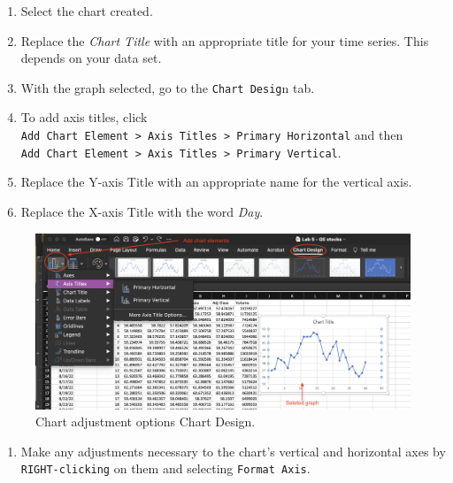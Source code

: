 \documentclass[
]{book}
\providecommand{\tightlist}{%
  \setlength{\itemsep}{0pt}\setlength{\parskip}{0pt}}
\begin{document}
\begin{enumerate}
\def\labelenumi{\arabic{enumi}.}
\setcounter{enumi}{2}
\tightlist
\item
  Select the chart created.
\item
  Replace the \emph{Chart Title} with an appropriate title for your time series. This depends on your data set.
\item
  With the graph selected, go to the \texttt{Chart\ Desig}n tab.
\item
  To add axis titles, click \texttt{Add\ Chart\ Element\ \textgreater{}\ Axis\ Titles\ \textgreater{}\ Primary\ Horizontal} and then \texttt{Add\ Chart\ Element\ \textgreater{}\ Axis\ Titles\ \textgreater{}\ Primary\ Vertical}.
\item
  Replace the Y-axis Title with an appropriate name for the vertical axis.
\item
  Replace the X-axis Title with the word \emph{Day}.
\end{enumerate}

\begin{figure}

{\centering \includegraphics[width=0.95\linewidth]{images/adjust-scatter} 

}

\caption{Chart adjustment options Chart Design.}\label{fig:adjust-scatter}
\end{figure}

\begin{enumerate}
\def\labelenumi{\arabic{enumi}.}
\setcounter{enumi}{8}
\tightlist
\item
  Make any adjustments necessary to the chart's vertical and horizontal axes by \texttt{RIGHT-clicking} on them and selecting \texttt{Format\ Axis}.
\end{enumerate}
\end{document}
